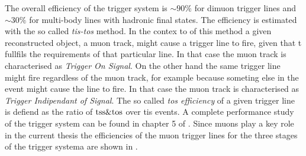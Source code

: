 The overall efficiency of the \lhcb trigger system is $\sim 90\%$ for dimuon trigger lines and $\sim 30\%$ 
for multi-body lines with hadronic final states. The efficiency is estimated with the so called {\it tis-tos} 
method. In the contex to of this method a given reconstructed object, \ie a muon track, might cause a 
trigger line to fire, given that t fullfils the requirements of that particular line. In that case the 
muon track is characterised as {\it Trigger On Signal}. On the other hand the same trigger line might 
fire regardless of the muon track, for example because someting else in the event might cause the line 
to fire. In that case the muon track is characterised as {\it Trigger Indipendant of Signal}. 
The so called {\it tos efficiency} of a given trigger line is defiend as the ratio of ${\rm tss}\&{\rm tos}$ 
over tis events. A complete performance study of the trigger system can be found in chapter 5 
of \cite{Aaij:2014jba}. Since muons play a key role in the current thesis the efficiencies of the muon 
trigger lines for the three stages of the \lhcb trigger systema are  shown in .

